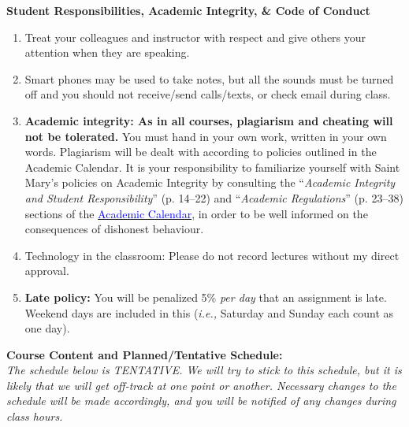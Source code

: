 \documentclass[hidelinks]{article}
\begin{document}
\begin{table}[H]
\begin{tabular}{@{} >{\raggedright}p{2.5cm} p{13.7cm}}
			\end{tabular}
		\end{table}		
		
		
	\textbf{Student Responsibilities, Academic Integrity, \& Code of Conduct}
		\begin{enumerate}[topsep=-8pt]
			\item Treat your colleagues and instructor with respect and give others your attention when they are speaking.
			\item Smart phones may be used to take notes, but all the sounds must be turned off and you should not receive/send calls/texts, or check email during class.
			\item \textbf{Academic integrity: As in all courses, plagiarism and cheating will not be tolerated.} You must hand in your own work, written in your own words. Plagiarism will be dealt with according to policies outlined in the Academic Calendar. It is your responsibility to familiarize yourself with Saint Mary's policies on Academic Integrity by consulting the ``\emph{Academic Integrity and Student Responsibility}'' (p. 14--22) and ``\emph{Academic Regulations}'' (p. 23--38) sections of the \href{https://smu.ca/webfiles/AcademicCalendar2019-2020Undergraduate(PDF).pdf}{\textcolor{blue}{Academic Calendar}}, in order to be well informed on the consequences of dishonest behaviour.  
			\item Technology in the classroom: Please do not record lectures without my direct approval.
			\item \textbf{Late policy:} You will be penalized 5\% \emph{per day} that an assignment is late. Weekend days are included in this (\emph{i.e.,} Saturday and Sunday each count as one day).
		\end{enumerate}
		
			
\newpage		
\textbf{Course Content and Planned/Tentative Schedule:}\\
\emph{The schedule below is TENTATIVE. We will try to stick to this schedule, but it is likely that we will get off-track at one point or another. Necessary changes to the schedule will be made accordingly, and you will be notified of any changes during class hours.}	
\end{document}
